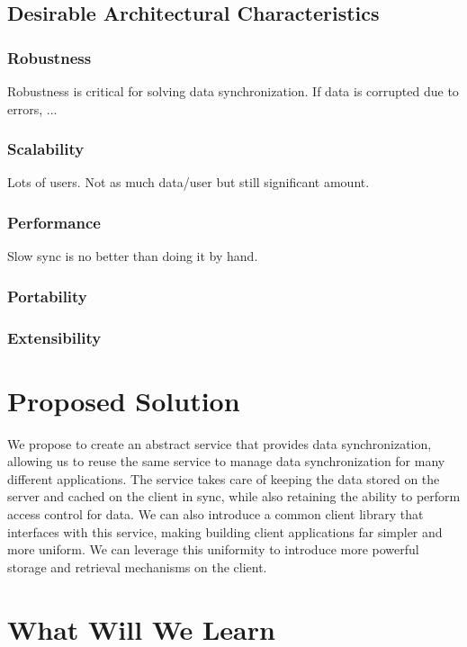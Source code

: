 \documentclass[12pt]{article}
\begin{document}
        \subsection{Desirable Architectural Characteristics}
            \subsubsection{Robustness}
            Robustness is critical for solving data synchronization. If data is corrupted due to errors, ...
            \subsubsection{Scalability}
            Lots of users. Not as much data/user but still significant amount.
            \subsubsection{Performance}
            Slow sync is no better than doing it by hand.
            \subsubsection{Portability}
            \subsubsection{Extensibility}

    \section{Proposed Solution}
    We propose to create an abstract service that provides data synchronization, allowing us to reuse the same service to manage data synchronization for many different applications.
    The service takes care of keeping the data stored on the server and cached on the client in sync, while also retaining the ability to perform access control for data.
    We can also introduce a common client library that interfaces with this service, making building client applications far simpler and more uniform.
    We can leverage this uniformity to introduce more powerful storage and retrieval mechanisms on the client.


    \section{What Will We Learn}
\end{document}
